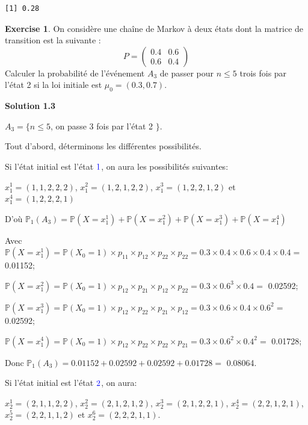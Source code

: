 \documentclass[
]{book}
\theoremstyle{definition}
\theoremstyle{definition}
\theoremstyle{definition}
\newtheorem{exercise}{Exercise}[chapter]
\theoremstyle{remark}
\begin{document}
\begin{verbatim}
[1] 0.28
\end{verbatim}

\begin{exercise}
\protect\hypertarget{exr:unnamed-chunk-24}{}{\label{exr:unnamed-chunk-24} } On considère une chaîne de Markov à deux états dont la matrice de transition est la suivante :
\[ P=\left( 
  \begin{array}{cc}
0.4 & 0.6 \\
0.6 & 0.4 
\end{array}
\right)\]
Calculer la probabilité de l'événement \(A_3\) de passer pour \(n \leq 5\) trois fois par l'état 2 si la loi initiale est \(\mu_0=(0.3,0.7)\).
\end{exercise}

\textbf{Solution 1.3}

\(A_3=\{n \leq 5\), on passe 3 fois par l'état 2 \(\}\).

Tout d'abord, déterminons les différentes possibilités.

Si l'état initial est l'état \(\color{blue}{1}\), on aura les possibilités suivantes:

\(x_1^1=(1, 1, 2, 2, 2)\), \(x_1^2=(1, 2,1, 2, 2)\), \(x_1^3=(1 ,2 ,2 ,1 , 2)\) et \(x_1^4=(1 , 2, 2, 2, 1)\)

D'où \(\mathbb{P}_1(A_3)=\mathbb{P}(X=x_1^1)+\mathbb{P}(X=x_1^2)+\mathbb{P}(X=x_1^3)+\mathbb{P}(X=x_1^4)\)

Avec \(\mathbb{P}(X=x_1^1)=\mathbb{P}(X_0=1)\times p_{11}\times p_{12}\times p_{22}\times p_{22}=0.3 \times 0.4 \times 0.6 \times 0.4 \times 0.4=\) 0.01152;

\(\mathbb{P}(X=x_1^2)=\mathbb{P}(X_0=1) \times p_{12}\times p_{21}\times p_{12}\times p_{22}=0.3\times 0.6^3 \times 0.4 =\) 0.02592;

\(\mathbb{P}(X=x_1^3)=\mathbb{P}(X_0=1)\times p_{12}\times p_{22}\times p_{21}\times p_{12}=0.3\times 0.6 \times 0.4 \times 0.6^2 =\) 0.02592;

\(\mathbb{P}(X=x_1^4)=\mathbb{P}(X_0=1)\times p_{12}\times p_{22}\times p_{22}\times p_{21}=0.3\times 0.6^2 \times 0.4^2 =\) 0.01728;

Donc \(\mathbb{P}_1(A_3)= 0.01152+0.02592+0.02592+0.01728=\) 0.08064.

Si l'état initial est l'état \(\color{blue}{2}\), on aura:

\(x_2^1=(2,1, 1, 2, 2)\), \(x_2^2=(2, 1, 2, 1,2)\), \(x_2^3=(2 , 1 , 2, 2, 1)\), \(x_2^4=(2, 2, 1, 2, 1)\), \(x_2^5=(2, 2 , 1 , 1 , 2)\) et \(x_2^6=(2, 2, 2 , 1 , 1)\).
\end{document}
